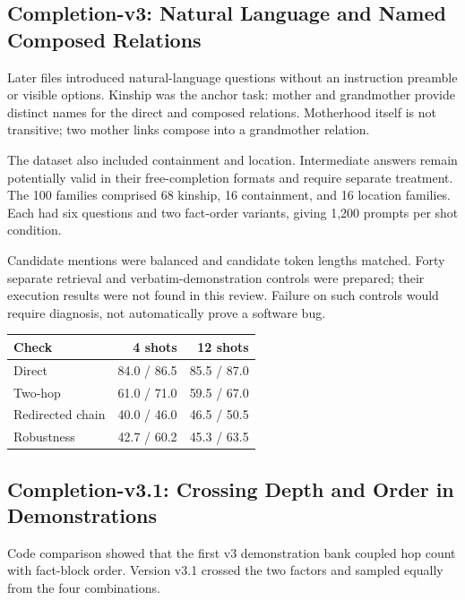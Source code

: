 \documentclass[11pt,a4paper]{article}
\begin{document}
\subsection{Completion-v3: Natural Language and Named Composed Relations}
Later files introduced natural-language questions without an instruction preamble or visible options. Kinship was the anchor task: mother and grandmother provide distinct names for the direct and composed relations. Motherhood itself is not transitive; two mother links compose into a grandmother relation.

The dataset also included containment and location. Intermediate answers remain potentially valid in their free-completion formats and require separate treatment. The 100 families comprised 68 kinship, 16 containment, and 16 location families. Each had six questions and two fact-order variants, giving 1,200 prompts per shot condition.

Candidate mentions were balanced and candidate token lengths matched. Forty separate retrieval and verbatim-demonstration controls were prepared; their execution results were not found in this review. Failure on such controls would require diagnosis, not automatically prove a software bug.

\begin{center}\small
\begin{tabular}{lrr}
\toprule
Check & 4 shots & 12 shots\\\midrule
Direct & 84.0 / 86.5 & 85.5 / 87.0\\
Two-hop & 61.0 / 71.0 & 59.5 / 67.0\\
Redirected chain & 40.0 / 46.0 & 46.5 / 50.5\\
Robustness & 42.7 / 60.2 & 45.3 / 63.5\\\bottomrule
\end{tabular}
\end{center}

\subsection{Completion-v3.1: Crossing Depth and Order in Demonstrations}
Code comparison showed that the first v3 demonstration bank coupled hop count with fact-block order. Version v3.1 crossed the two factors and sampled equally from the four combinations.
\end{document}
